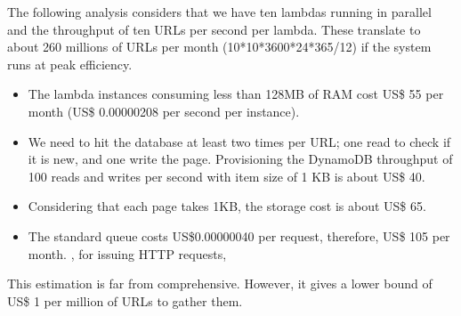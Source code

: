 \documentclass[english]{scrartcl}
\begin{document}
The following analysis considers that we have ten lambdas running in parallel and the throughput of ten URLs per second per lambda. These translate to about 260 millions of URLs per month (10*10*3600*24*365/12) if the system runs at peak efficiency.


\begin{itemize}
    \item The lambda instances consuming less than 128MB of RAM cost US\$ 55 per month (US\$ 0.00000208 per second per instance).
    \item We need to hit the database at least two times per URL; one read to check if it is new, and one write the page. Provisioning the DynamoDB throughput of 100 reads and writes per second with item size of 1 KB is about US\$ 40.
    \item Considering that each page takes 1KB, the storage cost is about US\$ 65.
    \item The standard queue costs US\$0.00000040 per request, therefore, US\$ 105 per month. , for issuing HTTP requests,
\end{itemize}

This estimation is far from comprehensive. However, it gives a lower bound of US\$ 1 per million of URLs to gather them.
\end{document}
